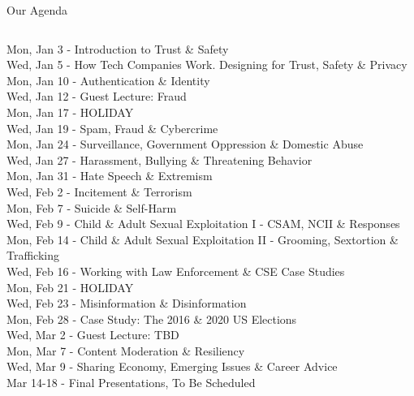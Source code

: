 \documentclass[nobackground,dvipsnames,table]{beamer}
\begin{document}
\begin{frame}{Our Agenda}
    \footnotesize
    \begin{columns}[t]
                    Mon, Jan 3 - Introduction to Trust \& Safety \\
                    Wed, Jan 5 - How Tech Companies Work. Designing for Trust, Safety \& Privacy \\
                    Mon, Jan 10 - Authentication \& Identity \\
                    Wed, Jan 12 - Guest Lecture: Fraud \\
                    Mon, Jan 17 - HOLIDAY \\
                    Wed, Jan 19 - Spam, Fraud \& Cybercrime \\
                    Mon, Jan 24 - Surveillance, Government Oppression \& Domestic Abuse \\
                    Wed, Jan 27 - Harassment, Bullying \& Threatening Behavior \\
                    Mon, Jan 31 - Hate Speech \& Extremism  \\
                    Wed, Feb 2 - Incitement \& Terrorism \\
                    Mon, Feb 7 - Suicide \& Self-Harm \\
                    Wed, Feb 9 - Child \& Adult Sexual Exploitation I - CSAM, NCII \& Responses \\
                    Mon, Feb 14 - Child \& Adult Sexual Exploitation II - Grooming, Sextortion \& Trafficking \\
                    Wed, Feb 16 - Working with Law Enforcement \& CSE Case Studies \\
                    Mon, Feb 21 - HOLIDAY \\
                    Wed, Feb 23 - Misinformation \& Disinformation \\
                    Mon, Feb 28 - Case Study: The 2016 \& 2020 US Elections \\
                    Wed, Mar 2 - Guest Lecture: TBD \\
                    Mon, Mar 7 - Content Moderation \& Resiliency \\ 
                    Wed, Mar 9 - Sharing Economy, Emerging Issues \& Career Advice \\
                    Mar 14-18 - Final Presentations, To Be Scheduled \\
        \end{columns}
\end{frame}
\end{document}
